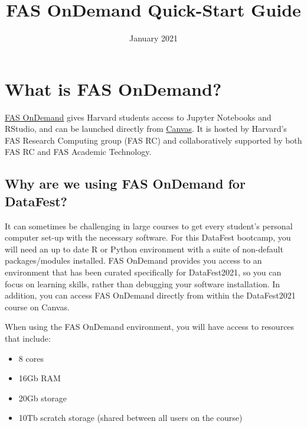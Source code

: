 \documentclass[]{book}
\title{FAS OnDemand Quick-Start Guide}
\author{}
\date{\vspace{-2.5em}January 2021}
\providecommand{\tightlist}{%
  \setlength{\itemsep}{0pt}\setlength{\parskip}{0pt}}
\begin{document}
\maketitle

{
\setcounter{tocdepth}{1}
\tableofcontents
}
\hypertarget{what-is-fas-ondemand}{%
\chapter*{What is FAS OnDemand?}\label{what-is-fas-ondemand}}

\href{https://atg.fas.harvard.edu/ondemand}{FAS OnDemand} gives Harvard students access to Jupyter Notebooks and RStudio, and can be launched directly from \href{https://canvas.harvard.edu/}{Canvas}. It is hosted by Harvard's FAS Research Computing group (FAS RC) and collaboratively supported by both FAS RC and FAS Academic Technology.

\hypertarget{why-are-we-using-fas-ondemand-for-datafest}{%
\section*{Why are we using FAS OnDemand for DataFest?}\label{why-are-we-using-fas-ondemand-for-datafest}}

It can sometimes be challenging in large courses to get every student's personal computer set-up with the necessary software. For this DataFest bootcamp, you will need an up to date R or Python environment with a suite of non-default packages/modules installed. FAS OnDemand provides you access to an environment that has been curated specifically for DataFest2021, so you can focus on learning skills, rather than debugging your software installation. In addition, you can access FAS OnDemand directly from within the DataFest2021 course on Canvas.

When using the FAS OnDemand environment, you will have access to resources that include:

\begin{itemize}
\tightlist
\item
  8 cores
\item
  16Gb RAM
\item
  20Gb storage
\item
  10Tb scratch storage (shared between all users on the course)
\end{itemize}
\end{document}
